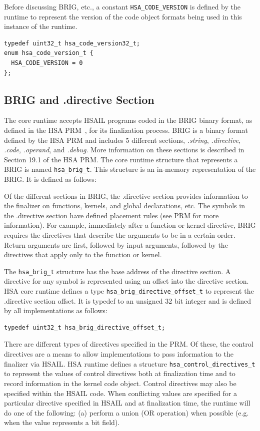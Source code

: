 \documentclass{book}
\begin{document}
\begin{appendices}
Before discussing BRIG, etc., a constant \texttt{HSA\_CODE\_VERSION}
is defined by the runtime to represent the version of the code
object formats being used in this instance of the runtime.

\begin{lstlisting}
typedef uint32_t hsa_code_version32_t;
enum hsa_code_version_t {
  HSA_CODE_VERSION = 0
};
\end{lstlisting}

\subsection{BRIG and .directive Section}
The core runtime accepts H\-S\-A\-I\-L programs coded in the
B\-R\-I\-G binary format, as defined in the HSA PRM~\cite{prm}, for its
finalization process. BRIG is a binary format defined by the HSA
PRM and includes 5 different sections, \emph{.string},
\emph{.directive}, \emph{.code}, \emph{.operand}, and \emph{.debug}.
More information on these sections is described in Section 19.1 of
the HSA PRM. The core runtime structure that represents a
BRIG is named \texttt{hsa\_brig\_t}. This structure is an in-memory
representation of the BRIG. It is defined as follows:



Of the different sections in BRIG, the .directive section provides
information to the finalizer on functions, kernels, and global
declarations, etc. The symbols in the .directive section have defined
placement rules (see PRM for more information). For example,
immediately after a function or kernel directive, BRIG requires the
directives that describe the arguments to be in a certain order.
Return arguments are first, followed by input arguments, followed by
the directives that apply only to the function or kernel.

The \texttt{hsa\_brig\_t} structure has the base address of the
directive section. A directive for any symbol is represented using
an offset into the directive section. HSA core runtime defines a
type \texttt{hsa\_brig\_directive\_offset\_t} to represent the
.directive section offset. It is typedef to an unsigned 32 bit
integer and is defined by all implementations as follows:

\begin{lstlisting}
typedef uint32_t hsa_brig_directive_offset_t;
\end{lstlisting}

There are different types of directives specified in the PRM. Of
these, the control directives are a means to allow implementations
to pass information to the finalizer via HSAIL. HSA runtime
defines a structure \texttt{hsa\_control\_directives\_t} to
represent the values of control directives both at finalization
time and to record information in the kernel code object. Control
directives may also be specified within the HSAIL code. When
conflicting values are specified for a particular directive
specified in HSAIL and at finalization time, the runtime will do one
of the following: (a) perform a union (OR operation) when possible
(e.g. when the value represents a bit field).


\end{appendices}
\end{document}
